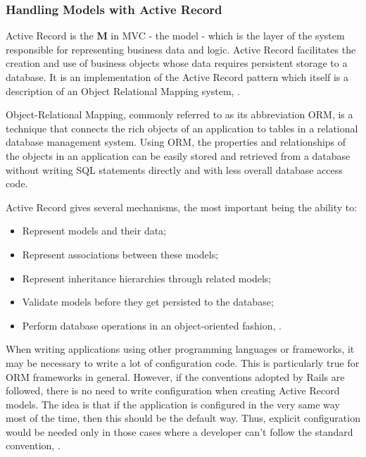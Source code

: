 \subsubsection{Handling Models with Active Record}
Active Record is the \textbf{M} in MVC - the model - which is the layer of the system responsible for representing business data and logic. Active Record facilitates the creation and use of business objects whose data requires persistent storage to a database. It is an implementation of the Active Record pattern which itself is a description of an Object Relational Mapping system, \cite{activeRecord}. 

Object-Relational Mapping, commonly referred to as its abbreviation ORM, is a technique that connects the rich objects of an application to tables in a relational database management system. Using ORM, the properties and relationships of the objects in an application can be easily stored and retrieved from a database without writing SQL statements directly and with less overall database access code\cite{orm}.

Active Record gives several mechanisms, the most important being the ability to:
\begin{itemize}
\item Represent models and their data;
\item Represent associations between these models;
\item Represent inheritance hierarchies through related models;
\item Validate models before they get persisted to the database;
\item Perform database operations in an object-oriented fashion, \cite{activeRecord-orm}.
\end{itemize}

When writing applications using other programming languages or frameworks, it may be necessary to write a lot of configuration code. This is particularly true for ORM frameworks in general. However, if the conventions adopted by Rails are followed, there is no need to write configuration when creating Active Record models. The idea is that if the application is configured in the very same way most of the time, then this should be the default way. Thus, explicit configuration would be needed only in those cases where a developer can't follow the standard convention, \cite{conventions}.

